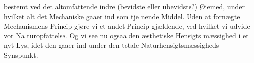 \documentclass[12pt,a4paper]{book}
\begin{document}
bestemt ved det altomfattende indre (bevidste eller ubevidste?)
Øiemed, under hvilket alt det Mechaniske gaaer ind som tje\-%
nende Middel. Uden at fornægte Mechanismens Princip gjøre
vi et andet Princip gjældende, ved hvilket vi udvide vor Na\-%
turopfattelse. Og vi see nu ogsaa den æsthetiske Hensigts\-%
mæssighed i et nyt Lys, idet den gaaer ind under den totale
Naturhensigtsmæssigheds Synspunkt.
\end{document}
